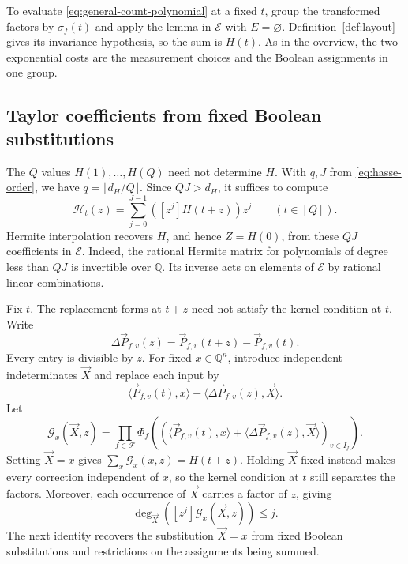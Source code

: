 To evaluate \eqref{eq:general-count-polynomial} at a fixed $t$, group
the transformed factors by $\sigma_f(t)$ and apply the lemma in
$\mathcal E$ with $E=\varnothing$. Definition~\ref{def:layout}
gives its invariance hypothesis, so the sum is $H(t)$. As in the overview, the two exponential costs
are the measurement choices and the Boolean assignments in one group.

\subsection{Taylor coefficients from fixed Boolean substitutions}
\label{subsec:fixed-boolean-substitutions}
The $Q$ values $H(1),\ldots,H(Q)$ need not determine $H$.
With $q,J$ from \eqref{eq:hasse-order}, we have $q=\lfloor d_H/Q\rfloor$.
Since $QJ>d_H$, it suffices to compute
\begin{equation}\label{eq:taylor-truncation}
 \mathcal H_t(z)=\sum_{j=0}^{J-1}([z^j]H(t+z))z^j
 \qquad(t\in[Q]).
\end{equation}
Hermite interpolation recovers $H$, and hence $Z=H(0)$, from these
$QJ$ coefficients in $\mathcal E$. Indeed, the rational Hermite
matrix for polynomials of degree less than $QJ$ is invertible over
$\mathbb Q$. Its inverse acts on elements of $\mathcal E$ by rational
linear combinations.

Fix $t$. The replacement forms at $t+z$ need not satisfy the kernel condition
at $t$. Write
\[
 \Delta\vec P_{f,v}(z)=\vec P_{f,v}(t+z)-\vec P_{f,v}(t).
\]
Every entry is divisible by $z$. For fixed $x\in\mathbb Q^n$,
introduce independent indeterminates $\vec X$ and replace each input by
\begin{equation}\label{eq:taylor-substitution}
 \langle\vec P_{f,v}(t),x\rangle
       +\langle\Delta\vec P_{f,v}(z),\vec X\rangle.
\end{equation}
Let
\begin{equation}\label{eq:auxiliary-polynomial}
 \mathcal G_x(\vec X,z)=\prod_{f\in\mathcal F}
 \Phi_f\!\left(
  (\langle\vec P_{f,v}(t),x\rangle+
   \langle\Delta\vec P_{f,v}(z),\vec X\rangle)_{v\in I_f}\right).
\end{equation}
Setting $\vec X=x$ gives
$\sum_x\mathcal G_x(x,z)=H(t+z)$.
Holding $\vec X$ fixed instead makes every correction independent
of $x$, so the kernel condition at $t$ still separates the factors.
Moreover, each occurrence of $\vec X$ carries a factor of $z$, giving
\begin{equation}\label{eq:degree-cost}
 \deg_{\vec X}([z^j]\mathcal G_x(\vec X,z))\le j.
\end{equation}
The next identity recovers the substitution $\vec X=x$ from fixed
Boolean substitutions and restrictions on the assignments being summed.

